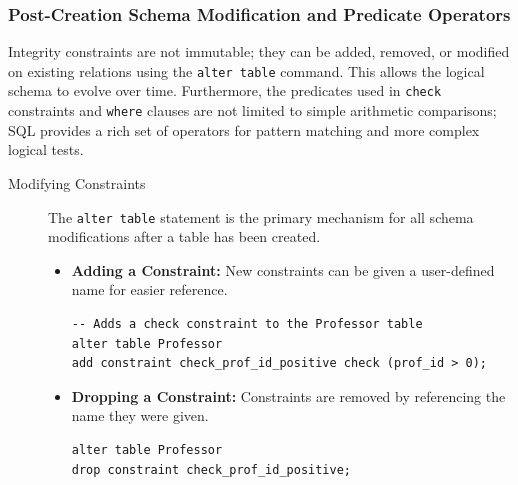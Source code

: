 \subsubsection{Post-Creation Schema Modification and Predicate Operators}
Integrity constraints are not immutable; they can be added, removed, or modified on existing relations using the \texttt{alter table} command. This allows the logical schema to evolve over time. Furthermore, the predicates used in \texttt{check} constraints and \texttt{where} clauses are not limited to simple arithmetic comparisons; SQL provides a rich set of operators for pattern matching and more complex logical tests.

\begin{description}
    \item[Modifying Constraints] The \texttt{alter table} statement is the primary mechanism for all schema modifications after a table has been created.
    \begin{itemize}
        \item \textbf{Adding a Constraint:} New constraints can be given a user-defined name for easier reference.
        \begin{verbatim}
-- Adds a check constraint to the Professor table
alter table Professor
add constraint check_prof_id_positive check (prof_id > 0);
        \end{verbatim}

        \item \textbf{Dropping a Constraint:} Constraints are removed by referencing the name they were given.
        \begin{verbatim}
alter table Professor
drop constraint check_prof_id_positive;
        \end{verbatim}
    \end{itemize}


\end{description}
